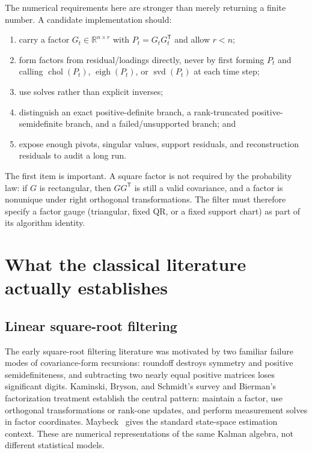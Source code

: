 \documentclass[11pt]{article}
\newcommand{\R}{\mathbb{R}}
\newcommand{\transpose}{^{\mathsf T}}
\begin{document}
The numerical requirements here are stronger than merely returning a finite
number.  A candidate implementation should:
\begin{enumerate}
  \item carry a factor $G_t\in\R^{n\times r}$ with
        $P_t=G_tG_t\transpose$ and allow $r<n$;
  \item form factors from residual/loadings directly, never by first forming
        $P_t$ and calling $\operatorname{chol}(P_t)$, $\operatorname{eigh}(P_t)$,
        or $\operatorname{svd}(P_t)$ at each time step;
  \item use solves rather than explicit inverses;
  \item distinguish an exact positive-definite branch, a rank-truncated
        positive-semidefinite branch, and a failed/unsupported branch; and
  \item expose enough pivots, singular values, support residuals, and
        reconstruction residuals to audit a long run.
\end{enumerate}

The first item is important.  A square factor is not required by the probability
law: if $G$ is rectangular, then $GG\transpose$ is still a valid covariance,
and a factor is nonunique under right orthogonal transformations.  The filter
must therefore specify a factor gauge (triangular, fixed QR, or a fixed support
chart) as part of its algorithm identity.

\section{What the classical literature actually establishes}

\subsection{Linear square-root filtering}

The early square-root filtering literature was motivated by two familiar
failure modes of covariance-form recursions: roundoff destroys symmetry and
positive semidefiniteness, and subtracting two nearly equal positive matrices
loses significant digits.  Kaminski, Bryson, and Schmidt's survey
\cite{kaminski1971} and Bierman's factorization treatment
\cite{bierman1977} establish the central pattern: maintain a factor, use
orthogonal transformations or rank-one updates, and perform measurement solves
in factor coordinates.  Maybeck~\cite{maybeck1979} gives the standard
state-space estimation context.  These are numerical representations of the
same Kalman algebra, not different statistical models.
\end{document}
